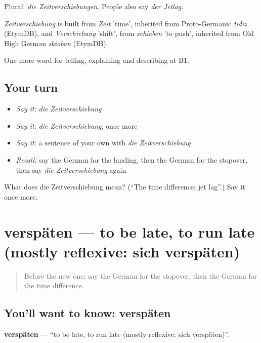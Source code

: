 Plural: \emph{die Zeitverschiebungen}. People also say \emph{der Jetlag}.

\begin{cousinweb}
\emph{Zeitverschiebung} is built from \emph{Zeit} 'time', inherited from Proto-Germanic \emph{tīdiz} (EtymDB), and \emph{Verschiebung} 'shift', from \emph{schieben} 'to push', inherited from Old High German \emph{skioban} (EtymDB).
\end{cousinweb}

\begin{grammarlens}[title={What you've built}]
One more word for telling, explaining and describing at B1.
\end{grammarlens}

\subsection*{Your turn}
\begin{itemize}
\raggedright
  \item \emph{Say it:} \emph{die Zeitverschiebung}
  \item \emph{Say it:} \emph{die Zeitverschiebung}, once more
  \item \emph{Say it:} a sentence of your own with \emph{die Zeitverschiebung}
  \item \emph{Recall:} say the German for the landing, then the German for the stopover, then say \emph{die Zeitverschiebung} again
\end{itemize}

\begin{tcolorbox}[breakable,colback=teal!4,colframe=teal!35!black,title={Before you move on}]
What does die Zeitverschiebung mean? (\textquotedblleft{}The time difference; jet lag\textquotedblright{}.) Say it once more.
\end{tcolorbox}
\section[verspäten]{verspäten — to be late, to run late (mostly reflexive: sich verspäten)}

\label{lesson:GE-C419-verspaeten}



\begin{quote}
Before the new one: say the German for the stopover, then the German for the time difference.
\end{quote}

\subsection*{You'll want to know: verspäten}
\textbf{verspäten} — \textquotedblleft{}to be late, to run late (mostly reflexive: sich verspäten)\textquotedblright{}.

